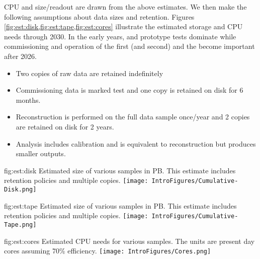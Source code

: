 CPU and size/readout are drawn from the above estimates. We then make the following assumptions about data sizes and retention.  
Figures \ref{fig:est:disk,fig:est:tape,fig:est:cores} illustrate the estimated storage and CPU needs through 2030.  In the early years,  and  prototype tests dominate while commissioning and operation of the first (and second)  and the  become important after 2026. 

\begin{itemize}
\item Two copies of raw data are retained indefinitely
\item Commissioning data is marked test and one copy is retained on disk for 6 months. 
\item Reconstruction is performed on the full data sample once/year and 2 copies are retained on disk for 2 years.  
\item Analysis includes calibration and is  equivalent to reconstruction but produces smaller outputs. 
\end{itemize}

\begin{dunefigure}
{fig:est:disk}
{Estimated size of various samples in PB. This estimate includes retention policies and multiple copies.}
\texttt{[image: IntroFigures/Cumulative-Disk.png]}
\end{dunefigure}

\begin{dunefigure}
{fig:est:tape}
{Estimated size of various samples in PB. This estimate includes retention policies and multiple copies.}
\texttt{[image: IntroFigures/Cumulative-Tape.png]}
\end{dunefigure}

\begin{dunefigure}
{fig:est:cores}
{Estimated CPU needs for  various samples.  The units are present day cores assuming 70\% efficiency.}
\texttt{[image: IntroFigures/Cores.png]}
\end{dunefigure}